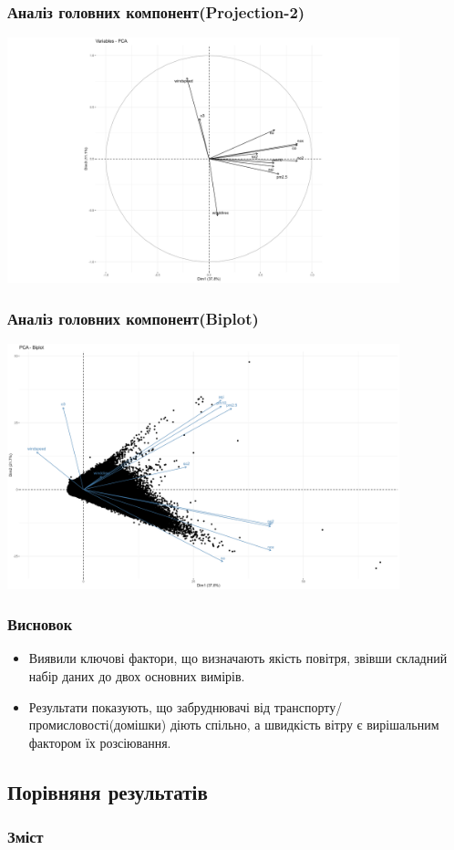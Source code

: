 ﻿\documentclass{beamer}
\begin{document}
\begin{frame}
\frametitle{Аналіз головних компонент(Projection-2)}
  \includegraphics[height=2.8in]{plots/lab4/pca/projection-1-3.png}
\end{frame}

\begin{frame}
\frametitle{Аналіз головних компонент(Biplot)}
  \includegraphics[height=2.8in]{plots/lab4/pca/biplot.png}
\end{frame}

\begin{frame}
  \frametitle{Висновок}
  \begin{itemize}
    \item Виявили ключові фактори, що визначають якість повітря,
     звівши складний набір даних до двох основних вимірів.
    \item Результати показують, що забруднювачі від транспорту/промисловості(домішки) діють спільно,
     а швидкість вітру є вирішальним фактором їх розсіювання.
  \end{itemize}
\end{frame}

\begin{frame}
  \section{Порівняня результатів}

  \frametitle{Зміст}
  \tableofcontents[currentsection]
\end{frame}
\end{document}

